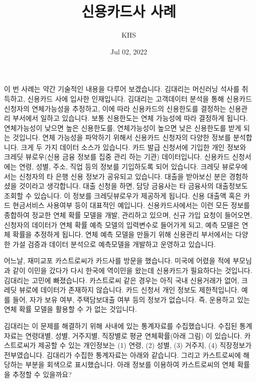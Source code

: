 \documentclass[letterpaper,10pt,english]{jupyterBook}
\title{신용카드사 사례}
\date{Jul 02, 2022}
\author{KHS}
\begin{document}
\pagestyle{empty}
\sphinxmaketitle
\pagestyle{plain}
\sphinxtableofcontents
\pagestyle{normal}
\label{\detokenize{chapter3/3.1.2_Use_Case::doc}}


\sphinxAtStartPar
이 번 사례는 약간 기술적인 내용을 다루어 보겠습니다. 김대리는 머신러닝 석사를 취득하고, 신용카드 사에 입사한 인재입니다. 김대리는 고객데이터 분석을 통해 신용카드 신청자의 연체가능성을 추정하고, 이에 따라 신용카드의 신용한도를 결정하는 신용관리 부서에서 일하고 있습니다. 보통 신용한도는 연체 가능성에 따라 결정하게 됩니다. 연체가능성이 낮으면 높은 신용한도를, 연체가능성이 높으면 낮은 신용한도를 받게 되는 것입니다. 연체 가능성을 파악하기 위해서 신용카드 신청자의 다양한 정보를 분석합니다. 크게 두 가지 데이터 소스가 있습니다. 카드 발급 신청서에 기입한 개인 정보와 크레딧 뷰로우(신용 금융 정보를 집중 관리 하는 기관) 데이터입니다. 신용카드 신청서에는 연령, 성별, 주소, 직업 등의 정보를 기입하도록 되어 있습니다. 크레딧 뷰로우에서는 신청자의 타 은행 신용 정보가 공유되고 있습니다. 대출을 받아보신 분은 경험하셨을 것이라고 생각합니다. 대출 신청을 하면, 담당 금융사는 타 금융사의 대출정보도 조회할 수 있습니다. 이 정보를 크레딧뷰로우가 제공하게 됩니다. 신용 대출액 혹은 카드 현금서비스 사용여부 등이 대표적인 예입니다. 신용카드사에서는 이런 모든 정보를 종합하여 정교한 연체 확률 모델을 개발, 관리하고 있으며, 신규 가입 요청이 들어오면, 신청자의 데이터가 연체 확률 예측 모델의 입력변수로 들어가게 되고, 예측 모델은 연체 확률을 추정하게 됩니다. 연체 예측 모델을 만들기 위해 신용관리 부서에서는 다양한 가설 검증과 데이터 분석으로 예측모델을 개발하고 운영하고 있습니다.

\sphinxAtStartPar
어느날, 재미교포 카스트로씨가 카드사를 방문을 했습니다. 미국에 어렸을 적에 부모님과 같이 이민을 갔다가 다시 한국에 역이민을 왔는데 신용카드가 필요하다는 것입니다. 김대리는 고민에 빠졌습니다. 카스트로씨 같은 경우는 아직 국내 신용거래가 없어, 크레딧 뷰로에 데이터가 존재하지 않습니다. 카드 신청서 개인 정보도 제한적입니다. 예를 들어, 자가 보유 여부, 주택담보대출 여부 등의 정보가 없습니다. 즉, 운용하고 있는 연체 확률 모델을 활용할 수 가 없는 것입니다.

\sphinxAtStartPar
김대리는 이 문제를 해결하기 위해 사내에 있는 통계자료를 수집했습니다. 수집된 통계자료는 연령대별, 성별, 거주지별, 직장별로 평균 연체확률(아래 그림) 이 있습니다. 카스트로씨가 제공할 수 있는 개인정보는 (1) 연령, (2) 성별, (3) 거주지, (4) 직장정보가 전부였습니다. 김대리가 수집한 통계자료는 아래와 같습니다. 그리고 카스트로씨에 해당하는 부분을 회색으로 표시했습니다. 아래 정보를 이용하여 카스트로씨의 연체 확률을 추정할 수 있을까요?
\end{document}
